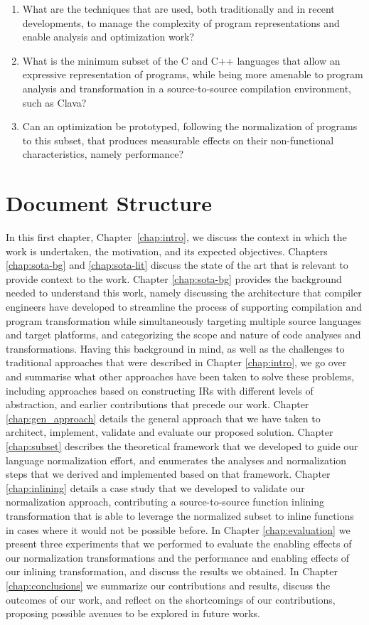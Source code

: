 \begin{enumerate}
    \item What are the techniques that are used, both traditionally and in recent developments, to manage the complexity of program representations and enable analysis and optimization work?
    \item What is the minimum subset of the C and C++ languages that allow an expressive representation of programs, while being more amenable to program analysis and transformation in a source-to-source compilation environment, such as Clava?
    \item Can an optimization be prototyped, following the normalization of programs to this subset, that produces measurable effects on their non-functional characteristics, namely performance?
\end{enumerate}

\section{Document Structure} \label{sec:struct}

In this first chapter, Chapter~\ref{chap:intro}, we discuss the context in which the work is undertaken, the motivation, and its expected objectives.
Chapters \ref{chap:sota-bg} and \ref{chap:sota-lit} discuss the state of the art that is relevant to provide context to the work. Chapter \ref{chap:sota-bg} provides the background needed to understand this work, namely discussing the architecture that compiler engineers have developed to streamline the process of supporting compilation and program transformation while simultaneously targeting multiple source languages and target platforms, and categorizing the scope and nature of code analyses and transformations. Having this background in mind, as well as the challenges to traditional approaches that were described in Chapter \ref{chap:intro}, we go over and summarise what other approaches have been taken to solve these problems, including approaches based on constructing IRs with different levels of abstraction, and earlier contributions that precede our work.
Chapter \ref{chap:gen_approach} details the general approach that we have taken to architect, implement, validate and evaluate our proposed solution.
Chapter \ref{chap:subset} describes the theoretical framework that we developed to guide our language normalization effort, and enumerates the analyses and normalization steps that we derived and implemented based on that framework.
Chapter \ref{chap:inlining} details a case study that we developed to validate our normalization approach, contributing a source-to-source function inlining transformation that is able to leverage the normalized subset to inline functions in cases where it would not be possible before.
In Chapter \ref{chap:evaluation} we present three experiments that we performed to evaluate the enabling effects of our normalization transformations and the performance and enabling effects of our inlining transformation, and discuss the results we obtained.
In Chapter \ref{chap:conclusions} we summarize our contributions and results, discuss the outcomes of our work, and reflect on the shortcomings of our contributions, proposing possible avenues to be explored in future works.
